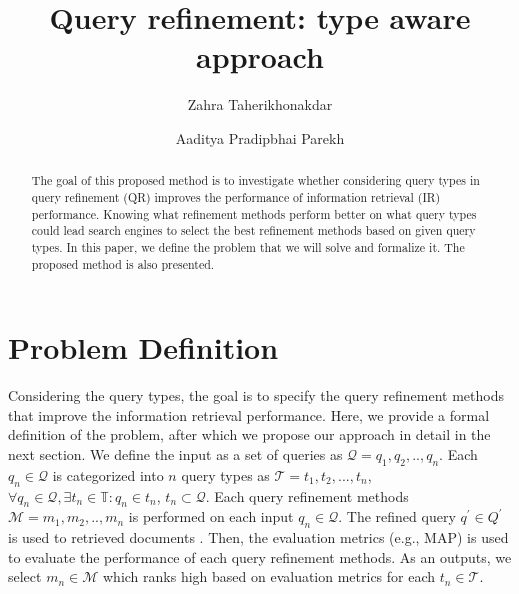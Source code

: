 \documentclass[sigconf]{acmart}
\begin{document}
\title{Query refinement: type aware approach}
\author{Zahra Taherikhonakdar}
\author{Aaditya Pradipbhai Parekh}

\begin{abstract}
The goal of this proposed method is to investigate whether considering query types in query refinement (QR) improves the performance of information retrieval (IR) performance. Knowing what refinement methods perform better on what query types could lead search engines to select the best refinement methods based on given query types. In this paper, we define the problem that we will solve and formalize it. The proposed method is also presented. 
\end{abstract}

\maketitle


\section{Problem Definition}
Considering the query types, the goal is to specify the query refinement methods that improve the information retrieval performance. Here, we provide a formal definition of the problem, after which we propose our approach in detail in the next section. We define the input as a set of queries as $\mathcal{Q}={q_1, q_2,..,q_n}$. Each ${q_n} \in \mathcal{Q}$ is categorized into $n$ query types as $\mathcal{T}={t_1, t_2,...,t_n}$, $\forall{q_n}\in\mathcal{Q},\exists{t_n}\in\mathbb{T}: {q_n}\in{t_n}$, ${t_n}\subset{\mathcal{Q}}$. Each query refinement methods $\mathcal{M}={m_1, m_2, ..,m_n}$ is performed on each input ${q_n}\in\mathcal{Q}$. The refined query ${q^'}\in{Q^'}$ is used to retrieved documents . Then, the evaluation metrics (e.g., MAP) is used to evaluate the performance of each query refinement methods. As an outputs, we select ${m_n}\in\mathcal{M}$ which ranks high based on evaluation metrics for each ${t_n}\in\mathcal{T}$.
\end{document}
